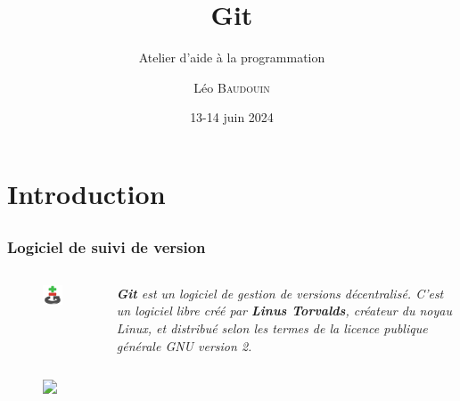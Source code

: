 \documentclass{beamer}
\title{Git}
\subtitle{Atelier d'aide à la programmation}
\author{L\'eo \textsc{Baudouin}}
\institute{
  {\url{baudouin.leo @ gmail.com}}
}
\date{13-14 juin 2024}
\begin{document}
\begin{frame}
  \titlepage
\end{frame}

\section{Introduction}

\subsection{}
\begin{frame}[label=git]
  \frametitle{Logiciel de suivi de version}
  \begin{columns}
    \begin{column}{0.2\linewidth}
      \begin{figure}
	\includegraphics[width=0.95\linewidth]{images/git-logo}  
      \end{figure}
    \end{column}
    \begin{column}{0.8\linewidth}  
      \textit{\textbf{Git} est un logiciel de gestion de versions décentralisé. C'est un logiciel libre créé par \textbf{Linus Torvalds}, créateur du noyau Linux, et distribué selon les termes de la licence publique générale GNU version 2.}
    \end{column}
  \end{columns}
  
  \begin{figure}
    \includegraphics<2>[width=0.95\linewidth]{images/github}  
  \end{figure}
  
\end{frame}
\end{document}
